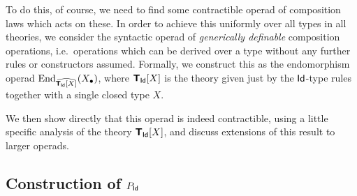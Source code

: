 To do this, of course, we need to find some contractible operad of composition laws which acts on these.  In order to achieve this uniformly over all types in all theories, we consider the syntactic operad of \emph{generically definable} composition operations, i.e.\ operations which can be derived over a type without any further rules or constructors assumed.  Formally, we construct this as the endomorphism operad $\mathrm{End}_{\widehat{\textbf{\textsf{T}}_{\mathsf{Id}} [X]}}(X_\bullet)$, where $\textbf{\textsf{T}}_{\mathsf{Id}} [X]$ is the theory given just by the $\mathsf{Id}$-type rules together with a single closed type $X$.

We then show directly that this operad is indeed contractible, using a little specific analysis of the theory $\textbf{\textsf{T}}_{\mathsf{Id}}[X]$, and discuss extensions of this result to larger operads.

\subsection*{Construction of \texorpdfstring{$P_{\mathsf{Id}}$}{P\_Id}}


